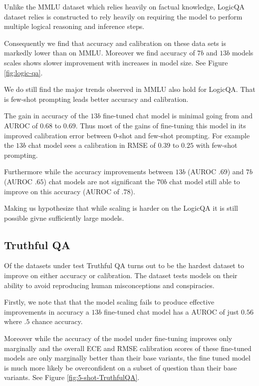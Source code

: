\documentclass[11pt]{article}
\begin{document}
Unlike the MMLU dataset which relies heavily on factual 
knowledge, LogicQA dataset relies is constructed to rely 
heavily on requiring the model to perform multiple 
logical reasoning and inference steps. 

Consequently we find that accuracy and 
calibration on  these data sets is markedly lower 
than on MMLU.  Moreover we find accuracy of 
$7b$ and $13b$ models scales shows slower 
improvement with increases  in model size. 
See Figure \ref{fig:logic-qa}.

We do still find the major trends observed in 
MMLU also hold for LogicQA. That is few-shot 
prompting leads better accuracy and calibration. 

The gain in accuracy of the $13b$ fine-tuned 
chat model is minimal going from and AUROC of 
$0.68$ to $0.69$. Thus most of the gains of 
fine-tuning  this model in its improved 
calibration error between $0$-shot and 
few-shot prompting. For example the $13b$ 
chat model sees a calibration in RMSE 
of $0.39$ to $0.25$ with few-shot 
prompting. 

Furthermore while the accuracy improvements 
between $13b$ (AUROC $.69$) and $7b$(AUROC $.65$) 
chat models are not significant the $70b$ chat 
model still able to improve on this accuracy 
(AUROC of $.78$). 

Making us hypothesize that while scaling is harder on 
the LogicQA it is still possible givne sufficiently 
large models.

\subsection{Truthful QA}

Of the datasets under test Truthful QA turns out to be 
the hardest dataset to improve on either accuracy 
or calibration. The dataset tests models  on 
their ability to avoid reproducing human 
misconceptions and conspiracies. 

Firstly, we note that that the model scaling fails 
to produce effective improvements in accuracy a $13b$  
fine-tuned chat model has a AUROC of just $0.56$ where 
$.5$ chance accuracy.  

Moreover while the accuracy of the model under 
fine-tuning improves only marginally and the overall 
ECE and  RMSE calibration scores of these fine-tuned models are 
only marginally better than their base variants, the fine tuned 
model is much more likely be overconfident on a 
subset of question than their base variants.  See Figure \ref{fig:5-shot-TruthfulQA}.
\end{document}
